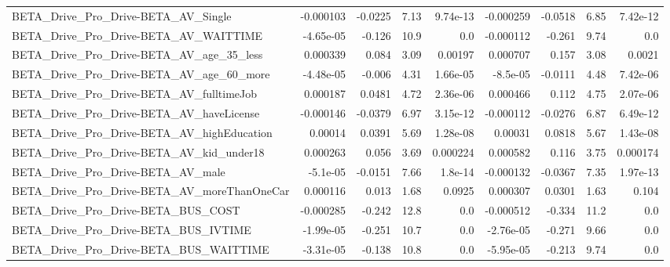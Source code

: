\begin{tabular}{lrrrrrrrr}
BETA\_Drive\_Pro\_Drive-BETA\_AV\_Single                &   -0.000103 &      -0.0225 &      7.13 & 9.74e-13 &  -0.000259 &     -0.0518 &         6.85 &      7.42e-12 \\
BETA\_Drive\_Pro\_Drive-BETA\_AV\_WAITTIME              &   -4.65e-05 &       -0.126 &      10.9 &      0.0 &  -0.000112 &      -0.261 &         9.74 &           0.0 \\
BETA\_Drive\_Pro\_Drive-BETA\_AV\_age\_35\_less           &    0.000339 &        0.084 &      3.09 &  0.00197 &   0.000707 &       0.157 &         3.08 &        0.0021 \\
BETA\_Drive\_Pro\_Drive-BETA\_AV\_age\_60\_more           &   -4.48e-05 &       -0.006 &      4.31 & 1.66e-05 &   -8.5e-05 &     -0.0111 &         4.48 &      7.42e-06 \\
BETA\_Drive\_Pro\_Drive-BETA\_AV\_fulltimeJob           &    0.000187 &       0.0481 &      4.72 & 2.36e-06 &   0.000466 &       0.112 &         4.75 &      2.07e-06 \\
BETA\_Drive\_Pro\_Drive-BETA\_AV\_haveLicense           &   -0.000146 &      -0.0379 &      6.97 & 3.15e-12 &  -0.000112 &     -0.0276 &         6.87 &      6.49e-12 \\
BETA\_Drive\_Pro\_Drive-BETA\_AV\_highEducation         &     0.00014 &       0.0391 &      5.69 & 1.28e-08 &    0.00031 &      0.0818 &         5.67 &      1.43e-08 \\
BETA\_Drive\_Pro\_Drive-BETA\_AV\_kid\_under18           &    0.000263 &        0.056 &      3.69 & 0.000224 &   0.000582 &       0.116 &         3.75 &      0.000174 \\
BETA\_Drive\_Pro\_Drive-BETA\_AV\_male                  &    -5.1e-05 &      -0.0151 &      7.66 &  1.8e-14 &  -0.000132 &     -0.0367 &         7.35 &      1.97e-13 \\
BETA\_Drive\_Pro\_Drive-BETA\_AV\_moreThanOneCar        &    0.000116 &        0.013 &      1.68 &   0.0925 &   0.000307 &      0.0301 &         1.63 &         0.104 \\
BETA\_Drive\_Pro\_Drive-BETA\_BUS\_COST                 &   -0.000285 &       -0.242 &      12.8 &      0.0 &  -0.000512 &      -0.334 &         11.2 &           0.0 \\
BETA\_Drive\_Pro\_Drive-BETA\_BUS\_IVTIME               &   -1.99e-05 &       -0.251 &      10.7 &      0.0 &  -2.76e-05 &      -0.271 &         9.66 &           0.0 \\
BETA\_Drive\_Pro\_Drive-BETA\_BUS\_WAITTIME             &   -3.31e-05 &       -0.138 &      10.8 &      0.0 &  -5.95e-05 &      -0.213 &         9.74 &           0.0 \\

\end{tabular}
